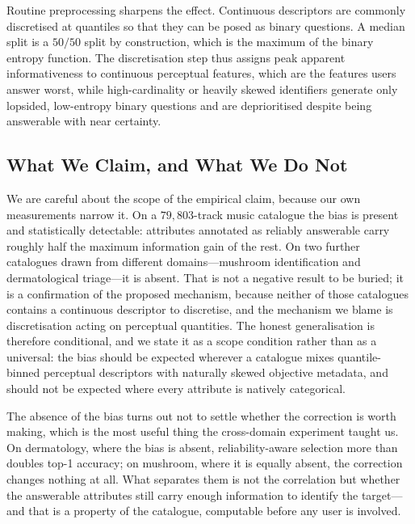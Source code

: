Routine preprocessing sharpens the effect. Continuous descriptors are commonly
discretised at quantiles so that they can be posed as binary questions. A
median split is a $50/50$ split by construction, which is the maximum of the
binary entropy function. The discretisation step thus assigns peak apparent
informativeness to continuous perceptual features, which are the features
users answer worst, while high-cardinality or heavily skewed identifiers
generate only lopsided, low-entropy binary questions and are deprioritised
despite being answerable with near certainty.

\subsection{What We Claim, and What We Do Not}

We are careful about the scope of the empirical claim, because our own
measurements narrow it. On a $79{,}803$-track music catalogue the bias is
present and statistically detectable: attributes annotated as reliably
answerable carry roughly half the maximum information gain of the rest. On two
further catalogues drawn from different domains---mushroom identification and
dermatological triage---it is absent. That is not a negative result to be
buried; it is a confirmation of the proposed mechanism, because neither of
those catalogues contains a continuous descriptor to discretise, and the
mechanism we blame is discretisation acting on perceptual quantities. The
honest generalisation is therefore conditional, and we state it as a scope
condition rather than as a universal: the bias should be expected wherever a
catalogue mixes quantile-binned perceptual descriptors with naturally skewed
objective metadata, and should not be expected where every attribute is
natively categorical.

The absence of the bias turns out not to settle whether the correction is
worth making, which is the most useful thing the cross-domain experiment
taught us. On dermatology, where the bias is absent, reliability-aware
selection more than doubles top-1 accuracy; on mushroom, where it is equally
absent, the correction changes nothing at all. What separates them is not the
correlation but whether the answerable attributes still carry enough
information to identify the target---and that is a property of the catalogue,
computable before any user is involved.

